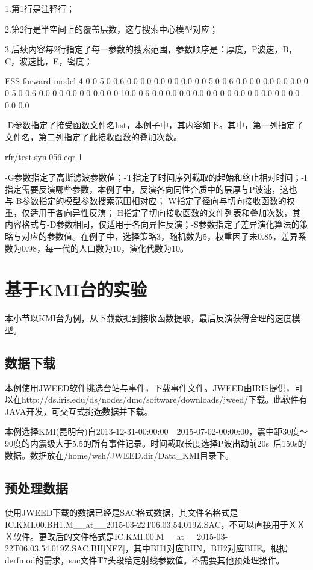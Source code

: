 \documentclass[a4paper]{article}
\begin{document}
1.第1行是注释行；\par
2.第2行是半空间上的覆盖层数，这与搜索中心模型对应；\par
3.后续内容每2行指定了每一参数的搜索范围，参数顺序是：厚度，P波速，B，C，波速比，E，密度；\par
\begin{fileCode}
ESS forward model
4
0	0
5.0	0.6	0.0	0.0	0.0	0.0	0.0
0       0
5.0     0.6     0.0     0.0     0.0     0.0     0.0
0	0
5.0     0.6     0.0     0.0     0.0     0.0     0.0
0	0
10.0    0.6     0.0     0.0    	0.0     0.0     0.0
0	0
0.0     0.0 	0.0	0.0	0.0	0.0	0.0
\end{fileCode}
\par
-D参数指定了接受函数文件名list，本例子中，其内容如下。其中，第一列指定了文件名，第二列指定了此接收函数的叠加次数。\par
\begin{fileCode}
rfr/test.syn.056.eqr 1
\end{fileCode}
\par
-G参数指定了高斯滤波参数值；-T指定了时间序列截取的起始和终止相对时间；-I指定需要反演哪些参数，本例子中，反演各向同性介质中的层厚与P波速，这也与-B参数指定的模型参数搜索范围相对应；-W指定了径向与切向接收函数的权重，仅适用于各向异性反演；-H指定了切向接收函数的文件列表和叠加次数，其内容格式与-D参数相同，仅适用于各向异性反演；-S参数指定了差异演化算法的策略与对应的参数值。在例子中，选择策略3，随机数为5，权重因子未0.85，差异系数为0.98，每一代的人口数为10，演化代数为10。\par


\clearpage\section{基于KMI台的实验}
本小节以KMI台为例，从下载数据到接收函数提取，最后反演获得合理的速度模型。\par
\subsection{数据下载}
本例使用JWEED软件挑选台站与事件，下载事件文件。JWEED由IRIS提供，可以在http://ds.iris.edu/ds/nodes/dmc/software/downloads/jweed/下载。此软件有JAVA开发，可交互式挑选数据并下载。\par
本例选择KMI(昆明台)自2013-12-31-00:00:00~~2015-07-02-00:00:00，震中距30度～90度的内震级大于5.5的所有事件记录。时间截取长度选择P波出动前20s~后150s的数据。数据放在/home/wsh/JWEED.dir/Data\_KMI目录下。\par
\subsection{预处理数据}
使用JWEED下载的数据已经是SAC格式数据，其文件名格式是IC.KMI.00.BH1.M\_\_at\_\_2015-03-22T06.03.54.019Z.SAC，不可以直接用于ＸＸＸ软件。更改后的文件格式是IC.KMI.00.M\_\_at\_\_2015-03-22T06.03.54.019Z.SAC.BH[NEZ]，其中BH1对应BHN，BH2对应BHE。根据derfmod的需求，sac文件T7头段给定射线参数值。不需要其他预处理操作。\par
\end{document}
